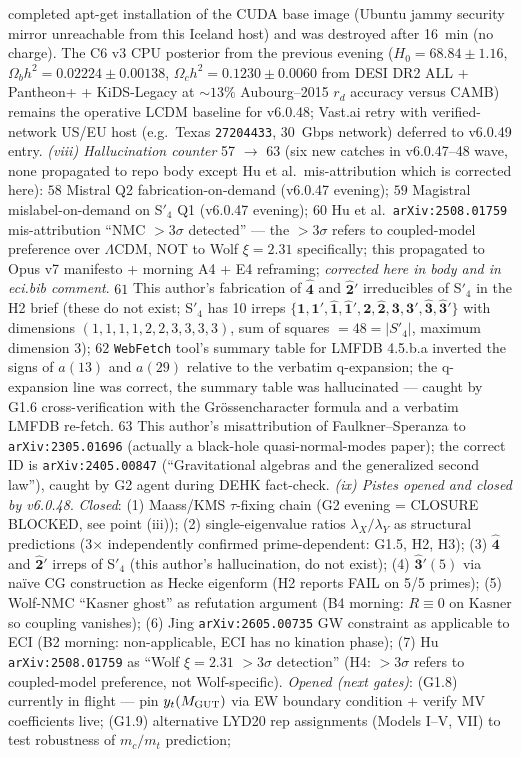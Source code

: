 \documentclass[reprint,amsmath,amssymb,aps,prd,superscriptaddress]{revtex4-2}
\providecommand{\1}{\mathbf{1}}
\begin{document}
completed apt-get installation of the CUDA base image (Ubuntu jammy security mirror unreachable from this Iceland host) and was destroyed after 16~min (no charge). The C6 v3 CPU posterior from the previous evening ($H_0 = 68.84 \pm 1.16$, $\Omega_b h^2 = 0.02224 \pm 0.00138$, $\Omega_c h^2 = 0.1230 \pm 0.0060$ from DESI DR2 ALL + Pantheon+ + KiDS-Legacy at $\sim 13\%$ Aubourg--2015 $r_d$ accuracy versus CAMB) remains the operative LCDM baseline for v6.0.48; Vast.ai retry with verified-network US/EU host (e.g.\ Texas \texttt{27204433}, 30~Gbps network) deferred to v6.0.49 entry. \emph{(viii) Hallucination counter} 57 $\to$ 63 (six new catches in v6.0.47--48 wave, none propagated to repo body except Hu et al.\ mis-attribution which is corrected here): $58$ Mistral Q2 fabrication-on-demand (v6.0.47 evening); $59$ Magistral mislabel-on-demand on S$'_4$ Q1 (v6.0.47 evening); $60$ Hu et al.\ \texttt{arXiv:2508.01759} mis-attribution ``NMC $> 3\sigma$ detected'' --- the $> 3\sigma$ refers to coupled-model preference over $\Lambda$CDM, NOT to Wolf $\xi = 2.31$ specifically; this propagated to Opus v7 manifesto + morning A4 + E4 reframing; \emph{corrected here in body and in eci.bib comment}. $61$ This author's fabrication of $\widehat{\bm{4}}$ and $\widehat{\bm{2}}'$ irreducibles of S$'_4$ in the H2 brief (these do not exist; S$'_4$ has 10 irreps $\{\bm{1}, \bm{1}', \widehat{\bm{1}}, \widehat{\bm{1}}', \bm{2}, \widehat{\bm{2}}, \bm{3}, \bm{3}', \widehat{\bm{3}}, \widehat{\bm{3}}'\}$ with dimensions $(1,1,1,1,2,2,3,3,3,3)$, sum of squares $= 48 = |S'_4|$, maximum dimension 3); $62$ \texttt{WebFetch} tool's summary table for LMFDB 4.5.b.a inverted the signs of $a(13)$ and $a(29)$ relative to the verbatim q-expansion; the q-expansion line was correct, the summary table was hallucinated --- caught by G1.6 cross-verification with the Gr\"ossencharacter formula and a verbatim LMFDB re-fetch. $63$ This author's misattribution of Faulkner--Speranza to \texttt{arXiv:2305.01696} (actually a black-hole quasi-normal-modes paper); the correct ID is \texttt{arXiv:2405.00847} (``Gravitational algebras and the generalized second law''), caught by G2 agent during DEHK fact-check. \emph{(ix) Pistes opened and closed by v6.0.48}. \emph{Closed}: (1) Maass/KMS $\tau$-fixing chain (G2 evening = CLOSURE BLOCKED, see point (iii)); (2) single-eigenvalue ratios $\lambda_X/\lambda_Y$ as structural predictions (3$\times$ independently confirmed prime-dependent: G1.5, H2, H3); (3) $\widehat{\bm{4}}$ and $\widehat{\bm{2}}'$ irreps of S$'_4$ (this author's hallucination, do not exist); (4) $\widehat{\bm{3}}'(5)$ via na\"ive CG construction as Hecke eigenform (H2 reports FAIL on 5/5 primes); (5) Wolf-NMC ``Kasner ghost'' as refutation argument (B4 morning: $R \equiv 0$ on Kasner so coupling vanishes); (6) Jing \texttt{arXiv:2605.00735} GW constraint as applicable to ECI (B2 morning: non-applicable, ECI has no kination phase); (7) Hu \texttt{arXiv:2508.01759} as ``Wolf $\xi=2.31$ $> 3\sigma$ detection'' (H4: $>3\sigma$ refers to coupled-model preference, not Wolf-specific). \emph{Opened (next gates)}: (G1.8) currently in flight --- pin $y_t(M_{\rm GUT})$ via EW boundary condition + verify MV coefficients live; (G1.9) alternative LYD20 rep assignments (Models I--V, VII) to test robustness of $m_c/m_t$ prediction; 
\end{document}
